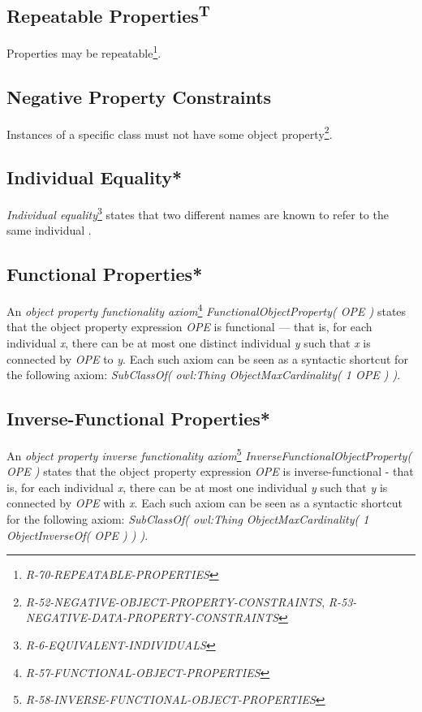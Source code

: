 \documentclass{llncs}
\begin{document}
\subsection{Repeatable Properties\textsuperscript{T}}

Properties may be repeatable\footnote{\emph{R-70-REPEATABLE-PROPERTIES}}.

\subsection{Negative Property Constraints}

Instances of a specific class must not have some object property\footnote{\emph{R-52-NEGATIVE-OBJECT-PROPERTY-CONSTRAINTS}, \emph{R-53-NEGATIVE-DATA-PROPERTY-CONSTRAINTS}}.

\subsection{Individual Equality*}

\emph{Individual equality}\footnote{\emph{R-6-EQUIVALENT-INDIVIDUALS}} states that two different names are known to refer to the same individual \cite{Kroetzsch2012}.

\subsection{Functional Properties*}

An \emph{object property functionality axiom}\footnote{\emph{R-57-FUNCTIONAL-OBJECT-PROPERTIES}} \emph{FunctionalObjectProperty( OPE )} states that the object property expression \emph{OPE} is functional — that is, for each individual \emph{x}, there can be at most one distinct individual \emph{y} such that \emph{x} is connected by \emph{OPE} to \emph{y}. Each such axiom can be seen as a syntactic shortcut for the following axiom: \emph{SubClassOf( owl:Thing ObjectMaxCardinality( 1 OPE ) )}.

\subsection{Inverse-Functional Properties*}

An \emph{object property inverse functionality axiom}\footnote{\emph{R-58-INVERSE-FUNCTIONAL-OBJECT-PROPERTIES}} \emph{InverseFunctionalObjectProperty( OPE )} states that the object property expression \emph{OPE} is inverse-functional - that is, for each individual \emph{x}, there can be at most one individual \emph{y} such that \emph{y} is connected by \emph{OPE} with \emph{x}. Each such axiom can be seen as a syntactic shortcut for the following axiom: \emph{SubClassOf( owl:Thing ObjectMaxCardinality( 1 ObjectInverseOf( OPE ) ) )}.
\end{document}
